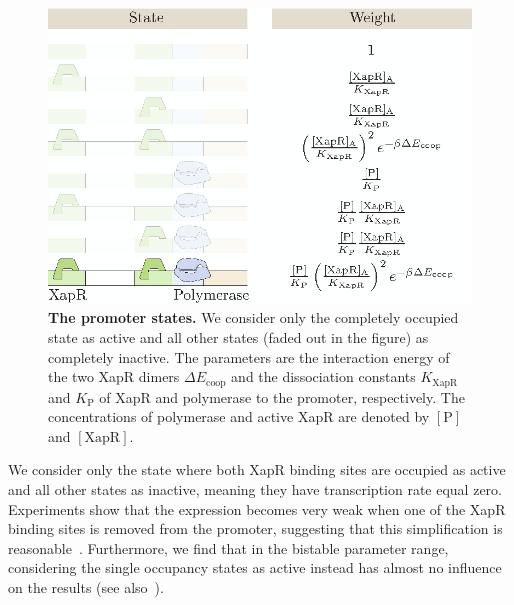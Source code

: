 \documentclass[10pt,letterpaper]{article}
\newcommand{\n}[1]{\mathrm{#1}}
\begin{document}
	\begin{figure}%
		\centering
		\includegraphics{media/States.eps}
		\caption{{\bf The promoter states.} We consider only the completely
			occupied state as active and all other states (faded out in the figure)
			as completely inactive. The parameters are the interaction energy of
			the two XapR dimers $\Delta E_{\n{coop}}$ and the dissociation
			constants $K_{\n{XapR}}$ and $K_{\n{P}}$ of XapR and polymerase
			to the promoter, respectively. The concentrations of polymerase
			and active XapR are denoted by $\n{[P]}$ and $\n{[XapR]}$.}
		\label{fig3:states}
	\end{figure}
	
	We consider only the state where both XapR binding sites are occupied as
	active and all other states as inactive, meaning they have transcription
	rate equal zero. Experiments show that the expression becomes very weak when one of
	the XapR binding sites is removed from the promoter, suggesting that this
	simplification is reasonable~\cite{Chure2019}. Furthermore, we find that in
	the bistable parameter range, considering the single occupancy states as
	active instead has almost no influence on the results (see
	also~).
	
\end{document}

